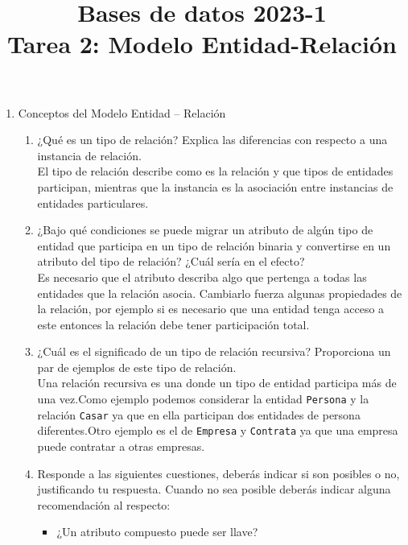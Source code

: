 \documentclass[12pt,a4paper]{article}
\title{Bases de datos 2023-1\\
Tarea 2: Modelo Entidad-Relación}
\begin{document}
\maketitle
\begin{enumerate}

	\item Conceptos del Modelo Entidad – Relación
		\begin{enumerate}
			\item ¿Qué es un tipo de relación? Explica las diferencias con respecto a una instancia de relación.\\

				El tipo de relación describe como es la relación y que tipos de entidades participan,
				mientras que la instancia es la asociación entre instancias de entidades particulares.\\

			\item ¿Bajo qué condiciones se puede migrar un atributo de algún tipo de entidad que
				participa en un tipo de relación binaria y convertirse en un atributo del tipo de
				relación? ¿Cuál sería en el efecto?\\

				Es necesario que el atributo describa algo que pertenga a todas las entidades
				que la relación asocia. Cambiarlo fuerza algunas propiedades de la relación,
				por ejemplo si es necesario que una entidad tenga acceso a este entonces
				la relación debe tener participación total.\\

			\item ¿Cuál es el significado de un tipo de relación recursiva?
				Proporciona un par de ejemplos de este tipo de relación.\\

				Una relación recursiva es una donde un tipo de entidad participa
				más de una vez.Como ejemplo podemos considerar la entidad \texttt{Persona}
				y la relación \texttt{Casar} ya que en ella participan dos entidades de
				persona diferentes.Otro ejemplo es el de \texttt{Empresa} y \texttt{Contrata}
				ya que una empresa puede contratar a otras empresas.\\

			\item Responde a las siguientes cuestiones, deberás indicar si son posibles o no,
				justificando tu respuesta. Cuando no sea posible deberás indicar alguna recomendación al respecto:
				\begin{itemize}
					\item ¿Un atributo compuesto puede ser llave?\\


\end{itemize}
\end{enumerate}
\end{enumerate}
\end{document}
